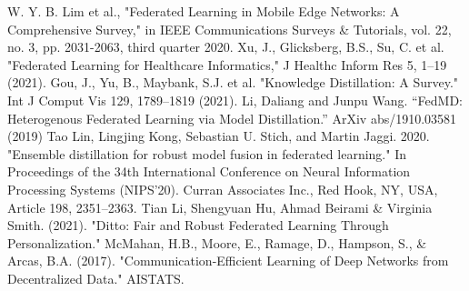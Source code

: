 \documentclass[conference]{IEEEtran}
\begin{document}
\begin{thebibliography}{00}
 W. Y. B. Lim et al., "Federated Learning in Mobile Edge Networks: A Comprehensive Survey," in IEEE Communications Surveys \& Tutorials, vol. 22, no. 3, pp. 2031-2063, third quarter 2020.
 Xu, J., Glicksberg, B.S., Su, C. et al. "Federated Learning for Healthcare Informatics," J Healthc Inform Res 5, 1–19 (2021).
 Gou, J., Yu, B., Maybank, S.J. et al. "Knowledge Distillation: A Survey." Int J Comput Vis 129, 1789–1819 (2021).
 Li, Daliang and Junpu Wang. “FedMD: Heterogenous Federated Learning via Model Distillation.” ArXiv abs/1910.03581 (2019)
 Tao Lin, Lingjing Kong, Sebastian U. Stich, and Martin Jaggi. 2020. "Ensemble distillation for robust model fusion in federated learning." In Proceedings of the 34th International Conference on Neural Information Processing Systems (NIPS'20). Curran Associates Inc., Red Hook, NY, USA, Article 198, 2351–2363.
 Tian Li, Shengyuan Hu, Ahmad Beirami \& Virginia Smith. (2021). "Ditto: Fair and Robust Federated Learning Through Personalization." 
 McMahan, H.B., Moore, E., Ramage, D., Hampson, S., \& Arcas, B.A. (2017). "Communication-Efficient Learning of Deep Networks from Decentralized Data." AISTATS.
\end{thebibliography}
\end{document}
